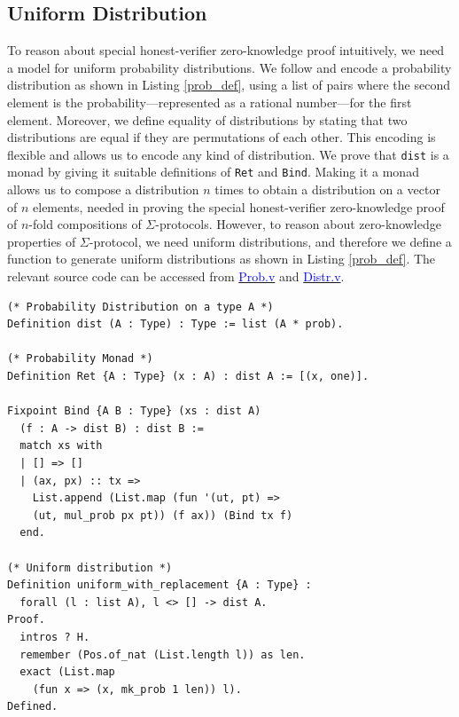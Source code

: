 \documentclass[sigconf,anonymous,review]{acmart}
\begin{document}
\subsection{Uniform Distribution}\label{uniform_dist}
To reason about special honest-verifier zero-knowledge proof 
intuitively, we need a model for uniform probability distributions. 
We follow \cite{erwig2006functional}  and 
encode a probability distribution as shown in Listing \ref{prob_def}, using a list of pairs where the 
second element is the probability---represented as 
a rational number---for the first element.
Moreover, we define equality of distributions by 
stating that two distributions are equal if they are permutations 
of each other. This encoding is flexible and allows us 
to encode any kind of distribution. We prove that \texttt{dist} is a 
monad \cite{erwig2006functional} by 
giving it suitable definitions of \texttt{Ret} and 
\texttt{Bind}. Making it a monad allows us 
to compose a distribution $n$ times to 
obtain a distribution on a vector of $n$ elements, 
needed in proving the special honest-verifier 
zero-knowledge proof of $n$-fold compositions of $\Sigma$-protocols.
However, to reason about zero-knowledge properties of $\Sigma$-protocol, we need uniform 
distributions, and therefore we define a function 
\texttt{} to generate uniform distributions as shown in Listing \ref{prob_def}.
The relevant source code can be accessed from \href{https://anonymous.4open.science/r/SigmaProtocol-EBA5/src/Probability/Prob.v}{\textcolor{blue}{Prob.v}} and \href{https://anonymous.4open.science/r/SigmaProtocol-EBA5/src/Probability/Distr.v}{\textcolor{blue}{Distr.v}}.

\begin{lstlisting}[frame=single, language=Coq, caption={Uniform Probability Distribution},
    label={prob_def},captionpos=t, basicstyle=\ttfamily\footnotesize,
    abovecaptionskip=-\medskipamount]
(* Probability Distribution on a type A *)
Definition dist (A : Type) : Type := list (A * prob).
  
(* Probability Monad *)
Definition Ret {A : Type} (x : A) : dist A := [(x, one)].

Fixpoint Bind {A B : Type} (xs : dist A)  
  (f : A -> dist B) : dist B := 
  match xs with 
  | [] => [] 
  | (ax, px) :: tx => 
    List.append (List.map (fun '(ut, pt) => 
    (ut, mul_prob px pt)) (f ax)) (Bind tx f)
  end.

(* Uniform distribution *)
Definition uniform_with_replacement {A : Type} : 
  forall (l : list A), l <> [] -> dist A.
Proof.
  intros ? H.
  remember (Pos.of_nat (List.length l)) as len.
  exact (List.map 
    (fun x => (x, mk_prob 1 len)) l).
Defined.
\end{lstlisting}
\end{document}
